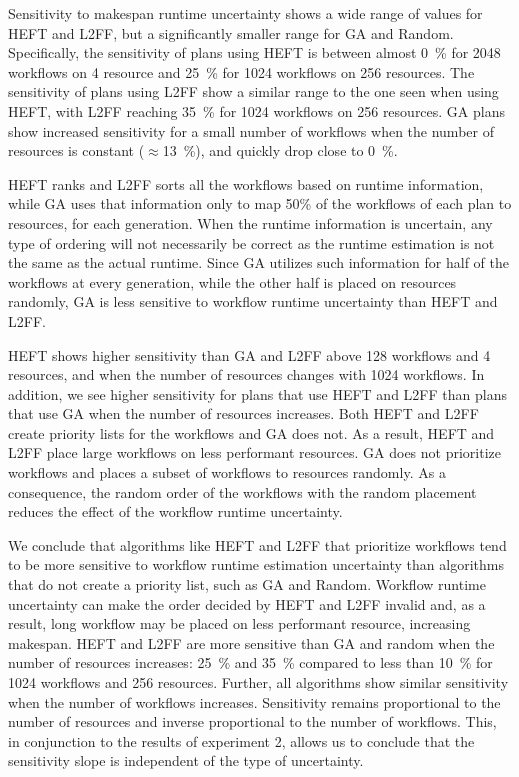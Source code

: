 Sensitivity to makespan runtime uncertainty shows a wide range of values for
HEFT and L2FF, but a significantly smaller range for GA and Random.
Specifically, the sensitivity of plans using HEFT is between almost 0~\% for
2048 workflows on 4 resource and 25~\% for 1024 workflows on 256 resources. The
sensitivity of plans using L2FF show a similar range to the one seen when using
HEFT, with L2FF reaching 35~\% for 1024 workflows on 256 resources. GA plans
show increased sensitivity for a small number of workflows when the number of
resources is constant ($\approx$13~\%), and quickly drop close to 0~\%.

HEFT ranks and L2FF sorts all the workflows based on runtime information, while
GA uses that information only to map 50\% of the workflows of each plan to
resources, for each generation. When the runtime information is uncertain, any
type of ordering will not necessarily be correct as the runtime estimation is
not the same as the actual runtime. Since GA utilizes such information for half
of the workflows at every generation, while the other half is placed on
resources randomly, GA is less sensitive to workflow runtime uncertainty than
HEFT and L2FF.

HEFT shows higher sensitivity than GA and L2FF above 128 workflows and 4
resources, and when the number of resources changes with 1024 workflows. In
addition, we see higher sensitivity for plans that use HEFT and L2FF than plans
that use GA when the number of resources increases. Both HEFT and L2FF create
priority lists for the workflows and GA does not. As a result, HEFT and L2FF
place large workflows on less performant resources. GA does not prioritize
workflows and places a subset of workflows to resources randomly. As a
consequence, the random order of the workflows with the random placement reduces
the effect of the workflow runtime uncertainty.

We conclude that algorithms like HEFT and L2FF that prioritize workflows tend to
be more sensitive to workflow runtime estimation uncertainty than algorithms
that do not create a priority list, such as GA and Random. Workflow runtime
uncertainty can make the order decided by HEFT and L2FF invalid and, as a
result, long workflow may be placed on less performant resource, increasing
makespan. HEFT and L2FF are more sensitive than GA and random when the number of
resources increases: 25~\% and 35~\% compared to less than 10~\% for 1024
workflows and 256 resources. Further, all algorithms show similar sensitivity
when the number of workflows increases. Sensitivity remains proportional to the
number of resources and inverse proportional to the number of workflows. This,
in conjunction to the results of experiment 2, allows us to conclude that the
sensitivity slope is independent of the type of uncertainty.

